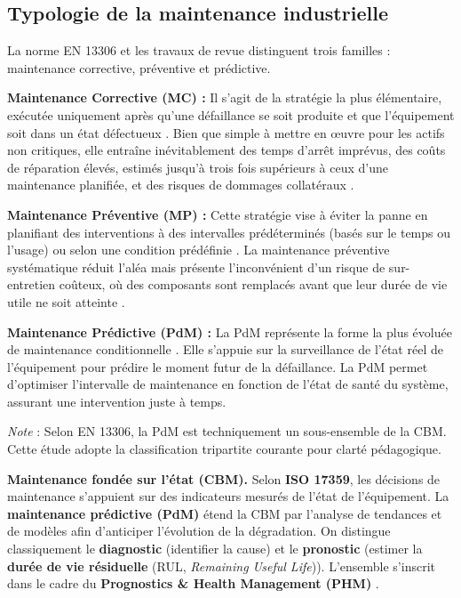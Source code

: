 \subsection{Typologie de la maintenance industrielle}

La norme EN 13306 \cite{en13306} et les travaux de revue \cite{ran2019} distinguent trois familles : maintenance corrective, préventive et prédictive.

\textbf{Maintenance Corrective (MC) :} Il s'agit de la stratégie la plus élémentaire, exécutée uniquement après qu'une défaillance se soit produite et que l'équipement soit dans un état défectueux \cite{en13306,ran2019}. Bien que simple à mettre en œuvre pour les actifs non critiques, elle entraîne inévitablement des temps d'arrêt imprévus, des coûts de réparation élevés, estimés jusqu'à trois fois supérieurs à ceux d'une maintenance planifiée, et des risques de dommages collatéraux \cite{ran2019}.

\textbf{Maintenance Préventive (MP) :} Cette stratégie vise à éviter la panne en planifiant des interventions à des intervalles prédéterminés (basés sur le temps ou l'usage) ou selon une condition prédéfinie \cite{en13306,ran2019}. La maintenance préventive systématique réduit l'aléa mais présente l'inconvénient d'un risque de sur-entretien coûteux, où des composants sont remplacés avant que leur durée de vie utile ne soit atteinte \cite{ran2019}.

\textbf{Maintenance Prédictive (PdM) :} La PdM représente la forme la plus évoluée de maintenance conditionnelle \cite{achouch2022,lee2014,jardine2006}. Elle s'appuie sur la surveillance de l'état réel de l'équipement pour prédire le moment futur de la défaillance. La PdM permet d'optimiser l'intervalle de maintenance en fonction de l'état de santé du système, assurant une intervention juste à temps.

\textit{Note} : Selon EN 13306, la PdM est techniquement un sous-ensemble de la CBM. Cette étude adopte la classification tripartite courante pour clarté pédagogique.

\textbf{Maintenance fondée sur l'état (CBM).} Selon \textbf{ISO 17359}, les décisions de maintenance s'appuient sur des indicateurs mesurés de l'état de l'équipement. La \textbf{maintenance prédictive (PdM)} étend la CBM par l'analyse de tendances et de modèles afin d'anticiper l'évolution de la dégradation. On distingue classiquement le \textbf{diagnostic} (identifier la cause) et le \textbf{pronostic} (estimer la \textbf{durée de vie résiduelle} (RUL, \textit{Remaining Useful Life})). L'ensemble s'inscrit dans le cadre du \textbf{Prognostics \& Health Management (PHM)} \cite{iso17359,lee2014,achouch2022}.

